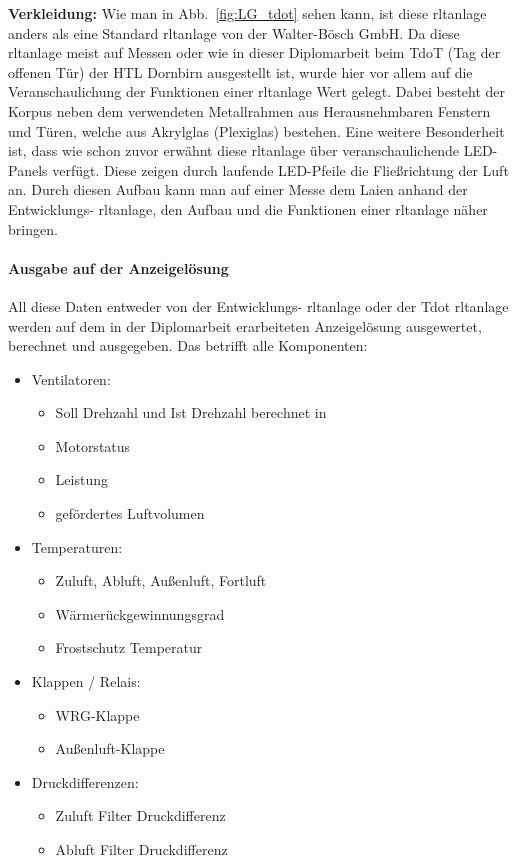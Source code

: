 \textbf{Verkleidung:}
Wie man in Abb.~\ref{fig:LG_tdot} sehen kann, ist diese \ac{rltanlage} anders als eine Standard \ac{rltanlage} von der Walter-Bösch GmbH. Da diese \ac{rltanlage} meist auf Messen oder wie in dieser Diplomarbeit beim TdoT (Tag der offenen Tür) der HTL Dornbirn ausgestellt ist, wurde hier vor allem auf die Veranschaulichung der Funktionen einer \ac{rltanlage} Wert gelegt. Dabei besteht der Korpus neben dem verwendeten Metallrahmen aus Herausnehmbaren Fenstern und Türen, welche aus Akrylglas (Plexiglas) bestehen. Eine weitere Besonderheit ist, dass wie schon zuvor erwähnt diese \ac{rltanlage} über veranschaulichende LED-Panels verfügt. Diese zeigen durch laufende LED-Pfeile die Fließrichtung der Luft an. Durch diesen Aufbau kann man auf \zB einer Messe dem Laien anhand der Entwicklungs- \ac{rltanlage}, den Aufbau und die Funktionen einer \ac{rltanlage} näher bringen.


\paragraph{Ausgabe auf der Anzeigelösung}
All diese Daten entweder von der Entwicklungs- \ac{rltanlage} oder der Tdot \ac{rltanlage} werden auf dem in der Diplomarbeit erarbeiteten Anzeigelösung ausgewertet, berechnet und ausgegeben. 
Das betrifft alle Komponenten:
\begin{itemize}

	\item Ventilatoren: 
	\begin{itemize}
		\item Soll Drehzahl und Ist Drehzahl berechnet in %
		\item Motorstatus
		\item Leistung 
		\item gefördertes Luftvolumen
	\end{itemize}

	\item Temperaturen:
	\begin{itemize}
		\item Zuluft, Abluft, Außenluft, Fortluft
		\item Wärmerückgewinnungsgrad
		\item Frostschutz Temperatur 
	\end{itemize}

	\item Klappen / Relais:
	\begin{itemize}
		\item WRG-Klappe
		\item Außenluft-Klappe 
	\end{itemize}
	
	\item Druckdifferenzen:
	\begin{itemize}
		\item Zuluft Filter Druckdifferenz
		\item Abluft Filter Druckdifferenz
	\end{itemize}
\end{itemize}

